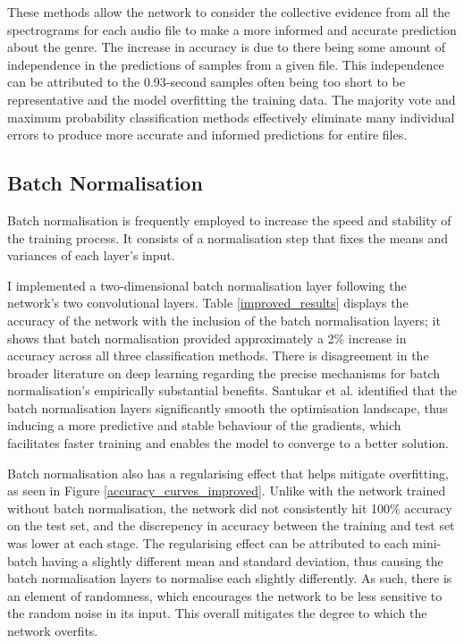 \documentclass[conference]{IEEEtran}
\begin{document}
These methods allow the network to consider the collective evidence from all the spectrograms for each audio file to make a more informed and accurate prediction about the genre.
The increase in accuracy is due to there being some amount of independence in the predictions of samples from a given file.
This independence can be attributed to the 0.93-second samples often being too short to be representative and the model overfitting the training data.
The majority vote and maximum probability classification methods effectively eliminate many individual errors to produce more accurate and informed predictions for entire files.

\subsection{Batch Normalisation}

Batch normalisation \cite{IoffeSzegedy} is frequently employed to increase the speed and stability of the training process.
It consists of a normalisation step that fixes the means and variances of each layer's input.

I implemented a two-dimensional batch normalisation layer following the network's two convolutional layers.
Table \ref{improved_results} displays the accuracy of the network with the inclusion of the batch normalisation layers; it shows that batch normalisation provided approximately a 2\% increase in accuracy across all three classification methods.
There is disagreement in the broader literature on deep learning regarding the precise mechanisms for batch normalisation's empirically substantial benefits.
Santukar et al. \cite{SanturkarEtAl} identified that the batch normalisation layers significantly smooth the optimisation landscape, thus inducing a more predictive and stable behaviour of the gradients, which facilitates faster training and enables the model to converge to a better solution.

Batch normalisation also has a regularising effect that helps mitigate overfitting, as seen in Figure \ref{accuracy_curves_improved}.
Unlike with the network trained without batch normalisation, the network did not consistently hit 100\% accuracy on the test set, and the discrepency in accuracy between the training and test set was lower at each stage.
The regularising effect can be attributed to each mini-batch having a slightly different mean and standard deviation, thus causing the batch normalisation layers to normalise each slightly differently.
As such, there is an element of randomness, which encourages the network to be less sensitive to the random noise in its input.
This overall mitigates the degree to which the network overfits.
\end{document}
